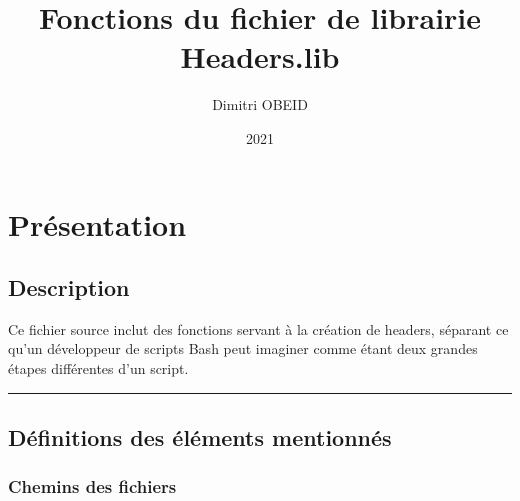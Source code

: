 \documentclass[a4paper,10pt]{article}
\title{\color{sec1}Fonctions du fichier de librairie \color{path}Headers.lib}\color{text}
\author{Dimitri OBEID}
\date{2021}
\begin{document}
    \maketitle
    \newpage

    \hypertarget{contents}{}
    \tableofcontents
    \newpage

    \color{sec1}
    \section{Présentation}\color{text}

    \color{sec2}
    \subsection{Description}\color{text}

    \begin{justify}
        Ce fichier source inclut des fonctions servant à la création de headers, séparant ce qu'un développeur de scripts Bash peut imaginer comme étant deux grandes étapes différentes d'un script.
    \end{justify}




    \color{sec2}\par\noindent\rule{\textwidth}{0.4pt}\color{text}

    \color{sec2}
    \subsection{Définitions des éléments mentionnés}\color{text}

    \color{sec3}
    \subsubsection{Chemins des fichiers}\color{text}
\end{document}
